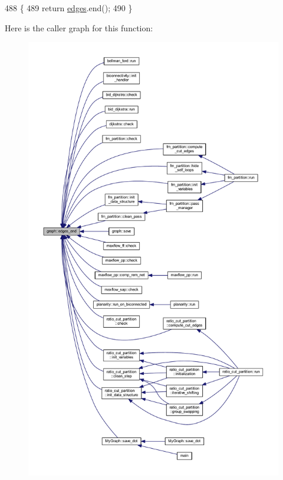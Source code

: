 \begin{DoxyCode}
488 \{
489     \textcolor{keywordflow}{return} \mbox{\hyperlink{classgraph_ab5b1c610cca1bcf72b05aacc28a48153}{edges}}.end();
490 \}
\end{DoxyCode}
Here is the caller graph for this function\+:\nopagebreak
\begin{figure}[H]
\begin{center}
\leavevmode
\includegraphics[height=550pt]{classgraph_aea8d7f976b85b6137f52d915e26639f6_icgraph}
\end{center}
\end{figure}
\mbox{\label{class_my_graph_ae6bb4074fb50ab3f3bd811e64621b9fc}} 

